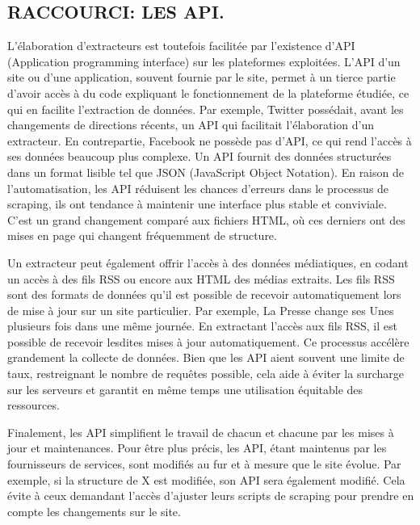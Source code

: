 \documentclass[
  letterpaper,
  DIV=11,
  numbers=noendperiod]{scrreprt}
\begin{document}
\hypertarget{raccourci-les-api.}{%
\subsection{RACCOURCI: LES API.}\label{raccourci-les-api.}}

L'élaboration d'extracteurs est toutefois facilitée par l'existence
d'API (Application programming interface) sur les plateformes
exploitées. L'API d'un site ou d'une application, souvent fournie par le
site, permet à un tierce partie d'avoir accès à du code expliquant le
fonctionnement de la plateforme étudiée, ce qui en facilite l'extraction
de données. Par exemple, Twitter possédait, avant les changements de
directions récents, un API qui facilitait l'élaboration d'un extracteur.
En contrepartie, Facebook ne possède pas d'API, ce qui rend l'accès à
ses données beaucoup plus complexe. Un API fournit des données
structurées dans un format lisible tel que JSON (JavaScript Object
Notation). En raison de l'automatisation, les API réduisent les chances
d'erreurs dans le processus de scraping, ils ont tendance à maintenir
une interface plus stable et conviviale. C'est un grand changement
comparé aux fichiers HTML, où ces derniers ont des mises en page qui
changent fréquemment de structure.

Un extracteur peut également offrir l'accès à des données médiatiques,
en codant un accès à des fils RSS ou encore aux HTML des médias
extraits. Les fils RSS sont des formats de données qu'il est possible de
recevoir automatiquement lors de mise à jour sur un site particulier.
Par exemple, La Presse change ses Unes plusieurs fois dans une même
journée. En extractant l'accès aux fils RSS, il est possible de recevoir
lesdites mises à jour automatiquement. Ce processus accélère grandement
la collecte de données. Bien que les API aient souvent une limite de
taux, restreignant le nombre de requêtes possible, cela aide à éviter la
surcharge sur les serveurs et garantit en même temps une utilisation
équitable des ressources.

Finalement, les API simplifient le travail de chacun et chacune par les
mises à jour et maintenances. Pour être plus précis, les API, étant
maintenus par les fournisseurs de services, sont modifiés au fur et à
mesure que le site évolue. Par exemple, si la structure de X est
modifiée, son API sera également modifié. Cela évite à ceux demandant
l'accès d'ajuster leurs scripts de scraping pour prendre en compte les
changements sur le site.
\end{document}
